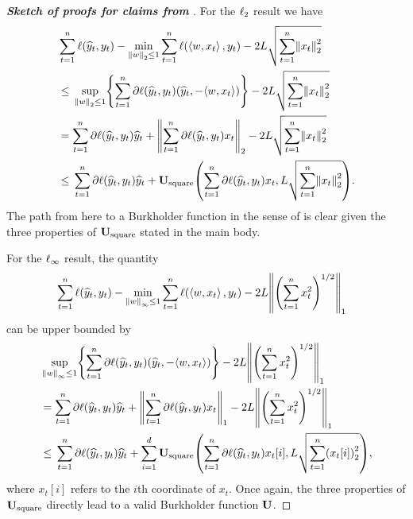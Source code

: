 \begin{proof}[\textbf{Sketch of proofs for claims from }]

For the $\ell_{2}$ result we have
\begin{align*}
& \sum_{t=1}^n\loss(\pred_t,y_t) - \min_{\norm{w}_{2}\leq 1}\sum_{t=1}^n \loss(\inner{w,x_t},y_t) - 2L\sqrt{\sum_{t=1}^{n}\nrm*{x_t}^{2}_{2}} \\
& \leq{} \sup_{\norm{w}_{2}\leq 1} \crl*{\sum_{t=1}^n\partial\loss(\pred_t,y_t)(\yh_t, - \tri*{w, x_t}) } - 2L\sqrt{\sum_{t=1}^{n}\nrm*{x_t}^{2}_{2}} \\ 
& = \sum_{t=1}^n\partial\loss(\pred_t,y_t)\yh_t + \nrm*{\sum_{t=1}^{n}\partial\loss(\pred_t,y_t)x_t}_{2} - 2L\sqrt{\sum_{t=1}^{n}\nrm*{x_t}^{2}_{2}} \\
& \leq{} \sum_{t=1}^n\partial\loss(\pred_t,y_t)\yh_t + \burk_{\textrm{square}}\prn*{\sum_{t=1}^{n}\partial\loss(\pred_t,y_t)x_t, L\sqrt{\sum_{t=1}^{n}\nrm*{x_t}^{2}_{2}}}. 
\end{align*}
The path from here to a Burkholder function in the sense of  is clear given the three properties of $\mathbf{U}_{\textrm{square}}$ stated in the main body.

For the $\ell_{\infty}$ result, the quantity
\begin{align*}
& \sum_{t=1}^n\loss(\pred_t,y_t) - \min_{\norm{w}_{\infty}\leq 1}\sum_{t=1}^n \loss(\inner{w,x_t},y_t) - 2L\nrm*{\prn*{\sum_{t=1}^{n}x_{t}^{2}}^{1/2}}_{1} 
\end{align*}
can be upper bounded by
\begin{align*}
&\sup_{\norm{w}_{\infty}\leq 1} \crl*{\sum_{t=1}^n\partial\loss(\pred_t,y_t)(\yh_t, - \tri*{w, x_t}) } - 2L\nrm*{\prn*{\sum_{t=1}^{n}x_{t}^{2}}^{1/2}}_{1} \\ 
& = \sum_{t=1}^n\partial\loss(\pred_t,y_t)\yh_t + \nrm*{\sum_{t=1}^{n}\partial\loss(\pred_t,y_t)x_t}_{1} - 2L\nrm*{\prn*{\sum_{t=1}^{n}x_{t}^{2}}^{1/2}}_{1} \\
& \leq{} \sum_{t=1}^n\partial\loss(\pred_t,y_t)\yh_t + \sum_{i=1}^{d}\burk_{\textrm{square}}\prn*{\sum_{t=1}^{n}\partial\loss(\pred_t,y_t)x_t[i], L\sqrt{\sum_{t=1}^{n}\prn*{x_t[i]}^{2}_{2}}},
\end{align*}
where $x_{t}[i]$ refers to the $i$th coordinate of $x_t$. Once again, the three properties of $\mathbf{U}_{\textrm{square}}$ directly lead to a valid Burkholder function $\mathbf{U}$.
\end{proof}


